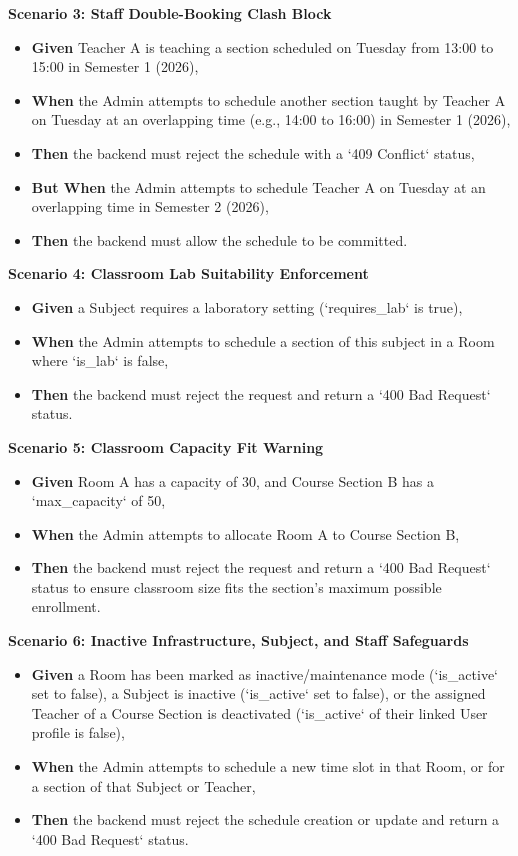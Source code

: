 \noindent\textbf{Scenario 3: Staff Double-Booking Clash Block}\\
\begin{itemize}
  \item \textbf{Given} Teacher A is teaching a section scheduled on Tuesday from 13:00 to 15:00 in Semester 1 (2026),
  \item \textbf{When} the Admin attempts to schedule another section taught by Teacher A on Tuesday at an overlapping time (e.g., 14:00 to 16:00) in Semester 1 (2026),
  \item \textbf{Then} the backend must reject the schedule with a `409 Conflict` status,
  \item \textbf{But When} the Admin attempts to schedule Teacher A on Tuesday at an overlapping time in Semester 2 (2026),
  \item \textbf{Then} the backend must allow the schedule to be committed.
\end{itemize}


\noindent\textbf{Scenario 4: Classroom Lab Suitability Enforcement}\\
\begin{itemize}
  \item \textbf{Given} a Subject requires a laboratory setting (`requires\_lab` is true),
  \item \textbf{When} the Admin attempts to schedule a section of this subject in a Room where `is\_lab` is false,
  \item \textbf{Then} the backend must reject the request and return a `400 Bad Request` status.
\end{itemize}


\noindent\textbf{Scenario 5: Classroom Capacity Fit Warning}\\
\begin{itemize}
  \item \textbf{Given} Room A has a capacity of 30, and Course Section B has a `max\_capacity` of 50,
  \item \textbf{When} the Admin attempts to allocate Room A to Course Section B,
  \item \textbf{Then} the backend must reject the request and return a `400 Bad Request` status to ensure classroom size fits the section's maximum possible enrollment.
\end{itemize}


\noindent\textbf{Scenario 6: Inactive Infrastructure, Subject, and Staff Safeguards}\\
\begin{itemize}
  \item \textbf{Given} a Room has been marked as inactive/maintenance mode (`is\_active` set to false), a Subject is inactive (`is\_active` set to false), or the assigned Teacher of a Course Section is deactivated (`is\_active` of their linked User profile is false),
  \item \textbf{When} the Admin attempts to schedule a new time slot in that Room, or for a section of that Subject or Teacher,
  \item \textbf{Then} the backend must reject the schedule creation or update and return a `400 Bad Request` status.
\end{itemize}

